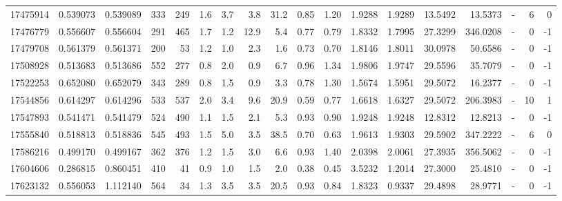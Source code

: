 \begin{tabular}{rrrrrrrrrrrrrrrlrr}
  17475914 & 0.539073 &   0.539089 &  333 &  249 &      1.6 &      3.7 &     3.8 &     31.2 &       0.85 &        1.20 &  1.9288 &  1.9289 &   13.5492 &   13.5373 &             - &        6 &          0 \\
  17476779 & 0.556607 &   0.556604 &  291 &  465 &      1.7 &      1.2 &    12.9 &      5.4 &       0.77 &        0.79 &  1.8332 &  1.7995 &   27.3299 &  346.0208 &             - &        0 &         -1 \\
  17479708 & 0.561379 &   0.561371 &  200 &   53 &      1.2 &      1.0 &     2.3 &      1.6 &       0.73 &        0.70 &  1.8146 &  1.8011 &   30.0978 &   50.6586 &             - &        0 &         -1 \\
  17508928 & 0.513683 &   0.513686 &  552 &  277 &      0.8 &      2.0 &     0.9 &      6.7 &       0.96 &        1.34 &  1.9806 &  1.9747 &   29.5596 &   35.7079 &             - &        0 &         -1 \\
  17522253 & 0.652080 &   0.652079 &  343 &  289 &      0.8 &      1.5 &     0.9 &      3.3 &       0.78 &        1.30 &  1.5674 &  1.5951 &   29.5072 &   16.2377 &             - &        0 &         -1 \\
  17544856 & 0.614297 &   0.614296 &  533 &  537 &      2.0 &      3.4 &     9.6 &     20.9 &       0.59 &        0.77 &  1.6618 &  1.6327 &   29.5072 &  206.3983 &             - &       10 &          1 \\
  17547893 & 0.541471 &   0.541479 &  524 &  490 &      1.1 &      1.5 &     2.1 &      5.3 &       0.93 &        0.90 &  1.9248 &  1.9248 &   12.8312 &   12.8213 &             - &        0 &         -1 \\
  17555840 & 0.518813 &   0.518836 &  545 &  493 &      1.5 &      5.0 &     3.5 &     38.5 &       0.70 &        0.63 &  1.9613 &  1.9303 &   29.5902 &  347.2222 &             - &        6 &          0 \\
  17586216 & 0.499170 &   0.499167 &  362 &  376 &      1.2 &      1.5 &     3.0 &      6.6 &       0.93 &        1.40 &  2.0398 &  2.0061 &   27.3935 &  356.5062 &             - &        0 &         -1 \\
  17604606 & 0.286815 &   0.860451 &  410 &   41 &      0.9 &      1.0 &     1.5 &      2.0 &       0.38 &        0.45 &  3.5232 &  1.2014 &   27.3000 &   25.4810 &             - &        0 &         -1 \\
  17623132 & 0.556053 &   1.112140 &  564 &   34 &      1.3 &      3.5 &     3.5 &     20.5 &       0.93 &        0.84 &  1.8323 &  0.9337 &   29.4898 &   28.9771 &             - &        0 &         -1 \\

\end{tabular}
